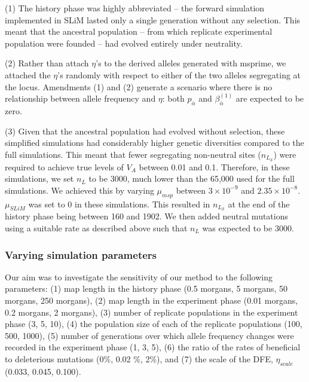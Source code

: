 \documentclass[12pt]{article}
\begin{document}
\begin{bibunit}
(1) The history phase was highly abbreviated -- the forward simulation implemented in SLiM lasted only a single generation without any selection. This meant that the ancestral population -- from which replicate experimental population were founded -- had evolved entirely under neutrality. 

(2) Rather than attach $\eta$'s to the derived alleles generated with msprime, we attached the $\eta$'s randomly with respect to either of the two alleles segregating at the locus. Amendments (1) and (2) generate a scenario where there is no relationship between allele frequency and $\eta$:  both $p_{\bar \alpha}$ and $\beta^{(1)}_{\bar \alpha}$ are expected to be zero.  

(3) Given that the ancestral population had evolved without selection, these simplified simulations had considerably higher genetic diversities compared to the full simulations. This meant that fewer segregating non-neutral sites ($n_{L_\mathcal{S}}$) were required to achieve true levels of $V_A$ between 0.01 and 0.1. Therefore, in these simulations, we set $n_L$ to be 3000, much lower than the 65,000 used for the full simulations. We achieved this by varying $\mu_{msp}$ between $3 \times 10^{-9}$ and $2.35 \times 10^{-8}$. $\mu_{SLiM}$ was set to 0 in these simulations. This resulted in $n_{L_\mathcal{S}}$ at the end of the history phase being between 160 and 1902. We then added neutral mutations using a suitable rate as described above such that $n_L$ was expected to be 3000. 

\subsubsection*{Varying simulation parameters}

Our aim was to investigate the sensitivity of our method to the following parameters: (1) map length in the history phase (0.5 morgans, 5 morgans, 50 morgans, 250 morgans), (2) map length in the experiment phase (0.01 morgans, 0.2 morgans, 2 morgans), (3) number of replicate populations in the experiment phase (3, 5, 10), (4) the population size of each of the replicate populations (100, 500, 1000), (5) number of generations over which allele frequency changes were recorded in the experiment phase (1, 3, 5), (6) the ratio of the rates of beneficial to deleterious mutations (0\%, 0.02 \%, 2\%), and (7) the scale of the DFE, $\eta_{scale}$ (0.033, 0.045, 0.100).


\end{bibunit}
\end{document}
